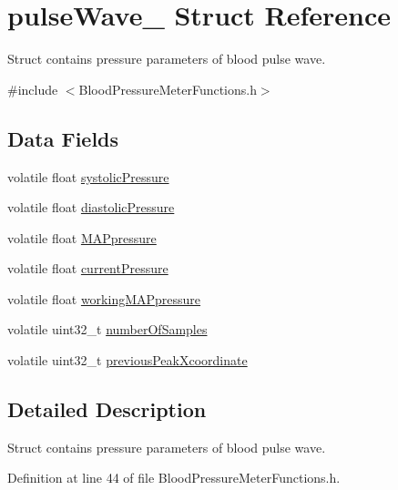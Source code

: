 \hypertarget{structpulse_wave__}{}\section{pulse\+Wave\+\_\+ Struct Reference}
\label{structpulse_wave__}


Struct contains pressure parameters of blood pulse wave.  




{\ttfamily \#include $<$Blood\+Pressure\+Meter\+Functions.\+h$>$}

\subsection*{Data Fields}
\begin{DoxyCompactItemize}
\item 
volatile float \mbox{\hyperlink{structpulse_wave___a9391ca9196460da2f46e5c6a1fb8ba9b_a9391ca9196460da2f46e5c6a1fb8ba9b}{systolic\+Pressure}}
\item 
volatile float \mbox{\hyperlink{structpulse_wave___a176133183fbe40e99e3113eca9e6dad6_a176133183fbe40e99e3113eca9e6dad6}{diastolic\+Pressure}}
\item 
volatile float \mbox{\hyperlink{structpulse_wave___a79065e37578a892272686efcd694d059_a79065e37578a892272686efcd694d059}{M\+A\+Ppressure}}
\item 
volatile float \mbox{\hyperlink{structpulse_wave___a375a42b884bc8ffbb701178874ed799e_a375a42b884bc8ffbb701178874ed799e}{current\+Pressure}}
\item 
volatile float \mbox{\hyperlink{structpulse_wave___acf16822418421c500eeb51c309a437f3_acf16822418421c500eeb51c309a437f3}{working\+M\+A\+Ppressure}}
\item 
volatile uint32\+\_\+t \mbox{\hyperlink{structpulse_wave___add1e957415f67321276f57cc21d72b87_add1e957415f67321276f57cc21d72b87}{number\+Of\+Samples}}
\item 
volatile uint32\+\_\+t \mbox{\hyperlink{structpulse_wave___a05e3742ad39c20cdd7de75621be1bb8a_a05e3742ad39c20cdd7de75621be1bb8a}{previous\+Peak\+Xcoordinate}}
\end{DoxyCompactItemize}


\subsection{Detailed Description}
Struct contains pressure parameters of blood pulse wave. 

Definition at line 44 of file Blood\+Pressure\+Meter\+Functions.\+h.



